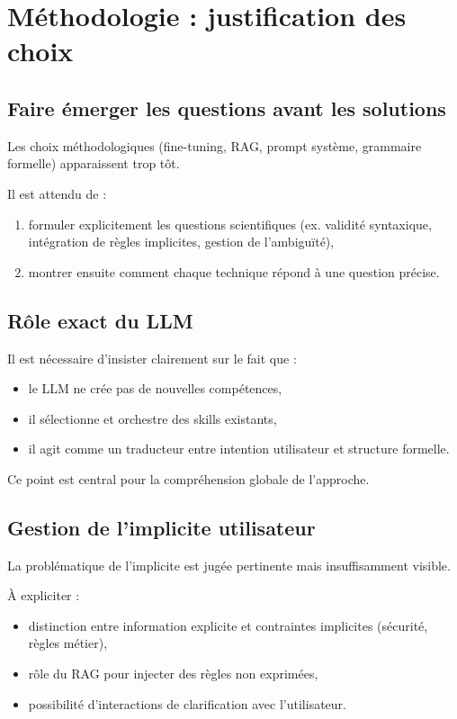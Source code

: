 \documentclass[11pt,a4paper]{article}
\begin{document}
\section{Méthodologie : justification des choix}

\subsection{Faire émerger les questions avant les solutions}

Les choix méthodologiques (fine-tuning, RAG, prompt système, grammaire formelle) apparaissent trop tôt.

Il est attendu de :
\begin{enumerate}
    \item formuler explicitement les questions scientifiques (ex. validité syntaxique, intégration de règles implicites, gestion de l’ambiguïté),
    \item montrer ensuite comment chaque technique répond à une question précise.
\end{enumerate}

\subsection{Rôle exact du LLM}

Il est nécessaire d’insister clairement sur le fait que :
\begin{itemize}
    \item le LLM ne crée pas de nouvelles compétences,
    \item il sélectionne et orchestre des skills existants,
    \item il agit comme un traducteur entre intention utilisateur et structure formelle.
\end{itemize}

Ce point est central pour la compréhension globale de l’approche.

\subsection{Gestion de l’implicite utilisateur}

La problématique de l’implicite est jugée pertinente mais insuffisamment visible.

À expliciter :
\begin{itemize}
    \item distinction entre information explicite et contraintes implicites (sécurité, règles métier),
    \item rôle du RAG pour injecter des règles non exprimées,
    \item possibilité d’interactions de clarification avec l’utilisateur.
\end{itemize}
\end{document}
